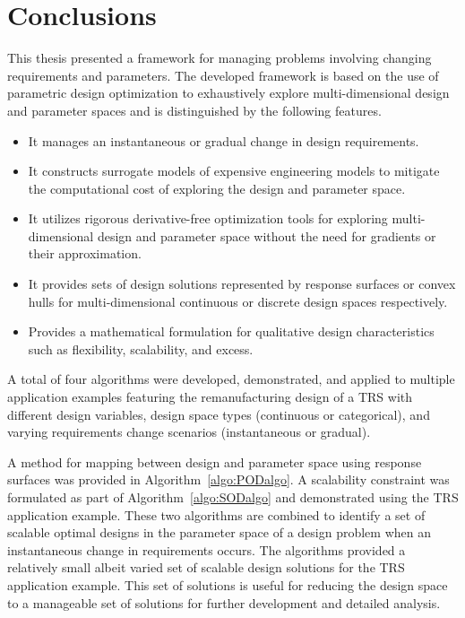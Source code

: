 \chapter{Conclusions}
\label{ch:conclusion}

This thesis presented a framework for managing problems involving changing requirements and parameters. The developed framework is based on the use of parametric design optimization to exhaustively explore multi-dimensional design and parameter spaces and is distinguished by the following features.

\begin{itemize}
    \item It manages an instantaneous or gradual change in design requirements.
    \item It constructs surrogate models of expensive engineering models to mitigate the computational cost of exploring the design and parameter space.
    \item It utilizes rigorous derivative-free optimization tools for exploring multi-dimensional design and parameter space without the need for gradients or their approximation.
    \item It provides sets of design solutions represented by response surfaces or convex hulls for multi-dimensional continuous or discrete design spaces respectively.
    \item Provides a mathematical formulation for qualitative design characteristics such as flexibility, scalability, and excess.
\end{itemize}

A total of four algorithms were developed, demonstrated, and applied to multiple application examples featuring the remanufacturing design of a \ac{TRS} with different design variables, design space types (continuous or categorical), and varying requirements change scenarios (instantaneous or gradual). 

A method for mapping between design and parameter space using response surfaces was provided in Algorithm~\ref{algo:PODalgo}. A scalability constraint was formulated as part of Algorithm~\ref{algo:SODalgo} and demonstrated using the \ac{TRS} application example. These two algorithms are combined to identify a set of scalable optimal designs in the parameter space of a design problem when an instantaneous change in requirements occurs. The algorithms provided a relatively small albeit varied set of scalable design solutions for the \ac{TRS} application example. This set of solutions is useful for reducing the design space to a manageable set of solutions for further development and detailed analysis.

